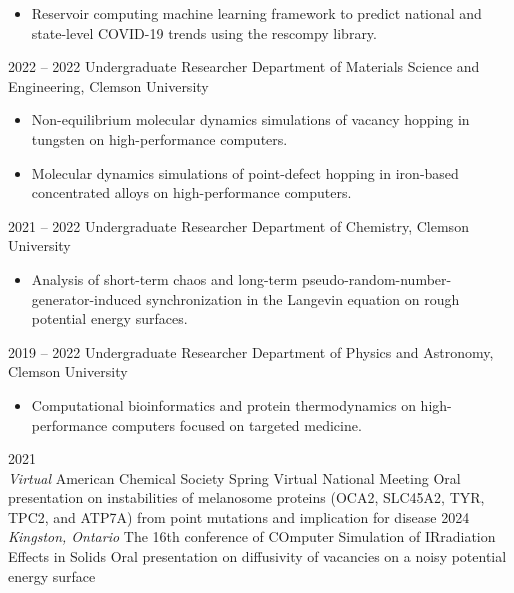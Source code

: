 \documentclass[9pt]{developercv} %
\begin{document}
\begin{entrylist}
{\begin{itemize}[noitemsep,topsep=0pt,parsep=0pt,partopsep=0pt, leftmargin=-1pt]
            \item Reservoir computing machine learning framework to predict national and state-level COVID-19 trends using the rescompy library.
        \end{itemize} 
        }
    \entry
		{2022 -- 2022}
		{Undergraduate Researcher}
		{Department of Materials Science and Engineering, Clemson University}
		{\vspace{-10pt}
        \begin{itemize}[noitemsep,topsep=0pt,parsep=0pt,partopsep=0pt, leftmargin=-1pt]
            \item Non-equilibrium molecular dynamics simulations of vacancy hopping in tungsten on high-performance computers.
            \item Molecular dynamics simulations of point-defect hopping in iron-based concentrated alloys on high-performance computers.
        \end{itemize} 
        }
    \entry
		{2021 -- 2022}
		{Undergraduate Researcher}
		{Department of Chemistry, Clemson University}
		{\vspace{-10pt}
        \begin{itemize}[noitemsep,topsep=0pt,parsep=0pt,partopsep=0pt, leftmargin=-1pt]
            \item Analysis of short-term chaos and long-term pseudo-random-number-generator-induced synchronization in the Langevin equation on rough potential energy surfaces.
        \end{itemize} 
        }
    \entry
		{2019 -- 2022}
		{Undergraduate Researcher}
		{Department of Physics and Astronomy, Clemson University}
		{\vspace{-10pt}
        \begin{itemize}[noitemsep,topsep=0pt,parsep=0pt,partopsep=0pt, leftmargin=-1pt]
            \item Computational bioinformatics and protein thermodynamics on high-performance computers focused on targeted medicine.
        \end{itemize}
        }
\end{entrylist}

\vspace{-10 pt}
\renewcommand\refname{}
\vspace{-1.5cm}


\begin{entrylist}
    \entry
        {2021 \\ \color{gray} \textit{Virtual}}
        {American Chemical Society Spring Virtual National Meeting}
        {}
        {Oral presentation on instabilities of melanosome proteins (OCA2, SLC45A2, TYR, TPC2, and ATP7A) from point mutations and implication for disease}
    \entry
        {2024 \\ \color{gray} \textit{Kingston, Ontario}}
        {The 16th conference of COmputer Simulation of IRradiation Effects in Solids}
        {}
        {Oral presentation on diffusivity of vacancies on a noisy potential energy surface}
\end{entrylist}
\end{document}
